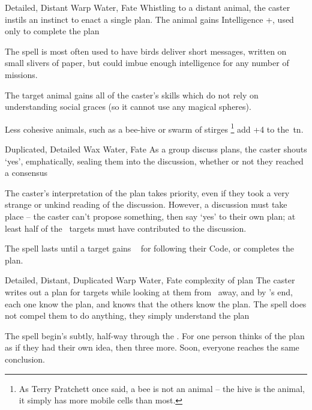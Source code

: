 \begin{multicols}{2}
\label{carrierCrow}
  {Detailed, Distant}%
  {Warp}%
  {Water, Fate}%
  {}%
  {Whistling to a distant animal, the caster instils an instinct to enact a single plan.
  The animal gains Intelligence +, used only to complete the plan}%
  {
  The spell is most often used to have birds deliver short messages, written on small slivers of paper, but could imbue enough intelligence for any number of missions.

  The target animal gains all of the caster's \glspl{skill} which do not rely on understanding social graces (so it cannot use any magical \glspl{sphere}).

  Less cohesive animals, such as a bee-hive or swarm of stirges%
  \footnote{As Terry Pratchett once said, a bee is not an animal -- the hive is the animal, it simply has more mobile cells than most.}
  add +4 to the~\gls{tn}.
  }



  {Duplicated, Detailed}%
  {Wax}%
  {Water, Fate}%
  {}%
  {As a group discuss plans, the caster shouts `yes', emphatically, sealing them into the discussion, whether or not they reached a consensus}%
  {The caster's interpretation of the plan takes priority, even if they took a very strange or unkind reading of the discussion.
  However, a discussion must take place -- the caster can't propose something, then say `yes' to their own plan; at least half of the ~targets must have contributed to the discussion.

  The spell lasts until a target gains ~ for following their Code, or completes the plan.}


  {Detailed, Distant, Duplicated}%
  {Warp}%
  {Water, Fate}%
  {complexity of plan}%
  {The caster writes out a plan for  targets while looking at them from \spellRange\ away, and by \showOnset's end, each one know the plan, and knows that the others know the plan.
  The spell does not compel them to do anything, they simply understand the plan}%
  {
  The spell begin's subtly, half-way through the \showOnset.
  For one person thinks of the plan as if they had their own idea, then three more.
  Soon, everyone reaches the same conclusion.

}
\end{multicols}
